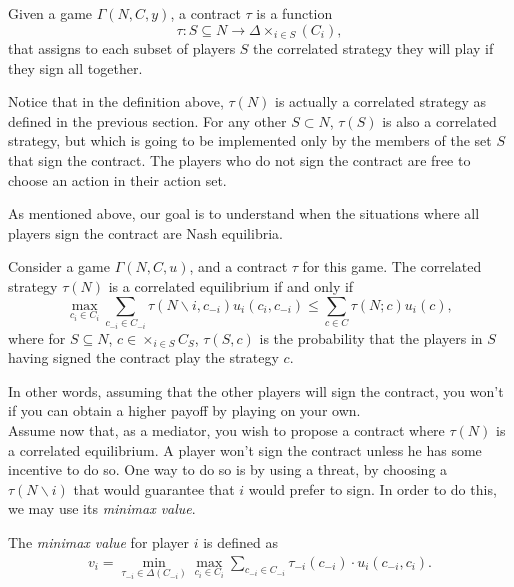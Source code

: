 \begin{definition}
Given a game $\Gamma(N,C,y)$, a contract $\tau$ is a function
$$ \tau : S \subseteq N \rightarrow \Delta \times_{i \in S}(C_i), $$
that assigns to each subset of players $S$ the correlated strategy  they will play if they sign all together.
\end{definition} 

Notice that in the definition above, $\tau(N)$ is actually a correlated strategy as defined in the previous section. For any other $S \subset N$, $\tau(S)$ is also a correlated strategy, but which is going to be implemented only by the members of the set $S$ that sign the contract. 
The players who do not sign the contract are free to choose an action in their action set.

As mentioned above, our goal is to understand when the situations where all players sign the contract are  Nash equilibria. 

\begin{proposition}
Consider a game $\Gamma(N,C,u)$, and a contract $\tau$ for this game. The correlated strategy $\tau(N)$ is a correlated equilibrium if and only if 
$$ \max_{c_i \in C_i} \sum_{c_{-i} \in C_{-i}} \tau(N \backslash i, c_{-i})u_i(c_i, c_{-i}) \leq \sum_{c \in C} \tau(N; c) u_{i}(c),$$
where for $S \subseteq N$, $c \in \times_{i \in S} C_S$, $\tau(S,c)$ is the probability that the players in $S$ having signed the contract play the strategy $c$.
\end{proposition}

In other words, assuming that the other players will sign the contract, you won't if you can obtain a higher payoff by playing on your own. \\
Assume now that, as a mediator, you wish to propose a contract where $\tau(N)$ is a correlated equilibrium. A player won't sign the contract unless he has some incentive to do so. One way to do so is by using a threat, by choosing  a $\tau(N \backslash i)$ that would guarantee that $i$ would prefer to sign. In order to do this, we may use its \emph{minimax value}.

\begin{definition}
The \emph{minimax value} for player $i$ is defined as
\begin{align*}
v_i = \min_{\tau_{-i} \in \Delta(C_{-i})} \max_{c_i \in C_i} \sum_{c_{-i} \in C_{-i}} \tau_{-i}(c_{-i}) \cdot u_i(c_{-i}, c_i).
\end{align*}
\end{definition}


